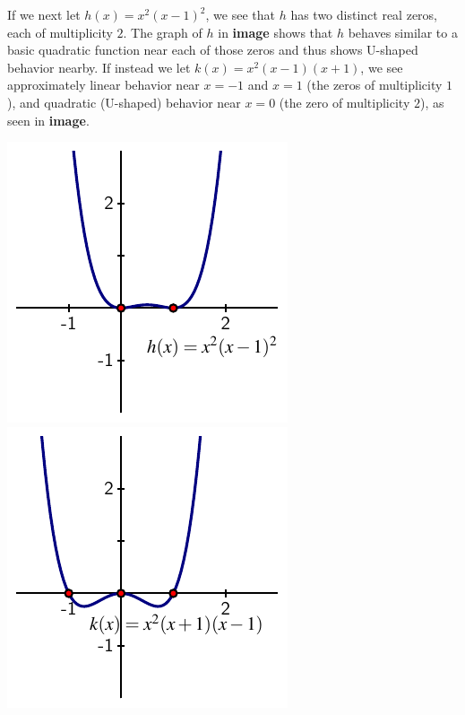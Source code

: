 \documentclass{ximera}
\begin{document}
If we next let $h(x) = x^2 (x-1)^2$, we see that $h$ has two distinct real zeros, each of multiplicity $2$.  The graph of $h$ in \textbf{image} shows that $h$ behaves similar to a basic quadratic function near each of those zeros and thus shows U-shaped behavior nearby.  If instead we let $k(x) = x^2(x-1)(x+1)$, we see approximately linear behavior near $x = -1$ and $x = 1$ (the zeros of multiplicity $1$), and quadratic (U-shaped) behavior near $x = 0$ (the zero of multiplicity $2$), as seen in \textbf{image}.%
\begin{image}
\includegraphics[width=1\linewidth]{images/polynomial-2-2.pdf}
\includegraphics[width=1\linewidth]{images/polynomial-2-1-1.pdf}
\end{image}
\end{document}
